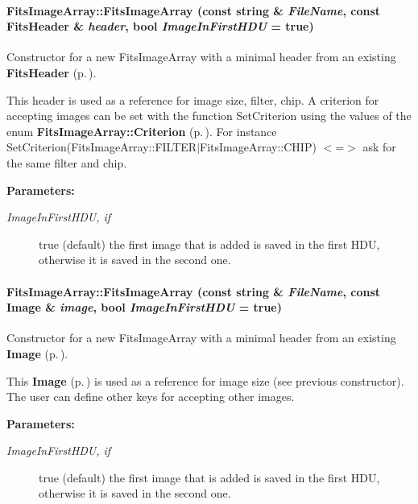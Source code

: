 \paragraph{\setlength{\rightskip}{0pt plus 5cm}Fits\-Image\-Array::Fits\-Image\-Array (const string \& {\em File\-Name}, const {\bf Fits\-Header} \& {\em header}, bool {\em Image\-In\-First\-HDU} = true)}\hfill\label{class_fitsimagearray_a1}


Constructor for a new Fits\-Image\-Array with a minimal header from an existing {\bf Fits\-Header} {\rm (p.\,\pageref{class_fitsheader})}.

This header is used as a reference for image size, filter, chip. A criterion for accepting images can be set with the function Set\-Criterion  using the values of the enum {\bf Fits\-Image\-Array::Criterion} {\rm (p.\,\pageref{class_fitsimagearray_s10})}.  For instance Set\-Criterion(Fits\-Image\-Array::FILTER$|$Fits\-Image\-Array::CHIP) $<$=$>$ ask for the same filter and chip.\begin{Desc}
\item[{\bf Parameters: }]\par
\begin{description}
\item[
{\em Image\-In\-First\-HDU, if}]true (default) the first image that is added is saved in the first HDU, otherwise it is saved in the second one. \end{description}
\end{Desc}
\paragraph{\setlength{\rightskip}{0pt plus 5cm}Fits\-Image\-Array::Fits\-Image\-Array (const string \& {\em File\-Name}, const {\bf Image} \& {\em image}, bool {\em Image\-In\-First\-HDU} = true)}\hfill\label{class_fitsimagearray_a2}


Constructor for a new Fits\-Image\-Array with a minimal header from an existing {\bf Image} {\rm (p.\,\pageref{class_image})}.

This {\bf Image} {\rm (p.\,\pageref{class_image})} is used as a reference for image size (see previous constructor). The user can define other keys for accepting other images.\begin{Desc}
\item[{\bf Parameters: }]\par
\begin{description}
\item[
{\em Image\-In\-First\-HDU, if}]true (default) the first image that is added is saved in the first HDU, otherwise it is saved in the second one. \end{description}
\end{Desc}


